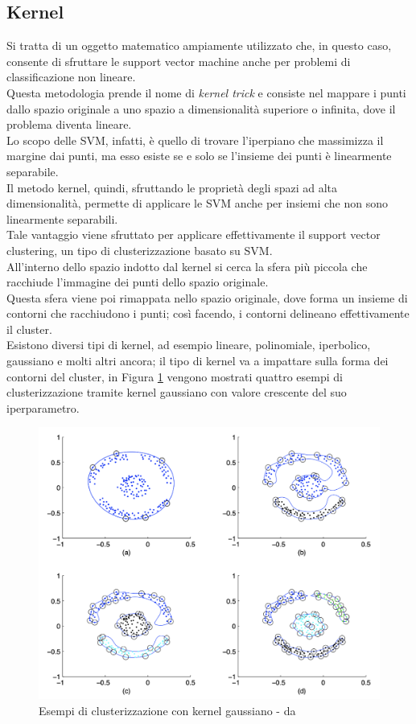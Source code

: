 \documentclass[12pt]{report}
\theoremstyle{definition}
\begin{document}
\subsection{Kernel} \label{kernel}
Si tratta di un oggetto matematico ampiamente utilizzato che, in questo caso, consente di sfruttare le support vector machine anche per problemi di classificazione non lineare.
\\
Questa metodologia prende il nome di \textit{kernel trick} e consiste nel mappare i punti dallo spazio originale a uno spazio a dimensionalità superiore o infinita, dove il problema diventa lineare.
\\
Lo scopo delle SVM, infatti, è quello di trovare l'iperpiano che massimizza il margine dai punti, ma esso esiste se e solo se l'insieme dei punti è linearmente separabile.
\\
Il metodo kernel, quindi, sfruttando le proprietà degli spazi ad alta dimensionalità, permette di applicare le SVM anche per insiemi che non sono linearmente separabili.
\\
Tale vantaggio viene sfruttato per applicare effettivamente il support vector clustering, un tipo di clusterizzazione basato su SVM.
\\
All'interno dello spazio indotto dal kernel si cerca la sfera più piccola che racchiude l'immagine dei punti dello spazio originale.
\\
Questa sfera viene poi rimappata nello spazio originale, dove forma un insieme di contorni che racchiudono i punti; così facendo, i contorni delineano effettivamente il cluster.
\\
Esistono diversi tipi di kernel, ad esempio lineare, polinomiale, iperbolico, gaussiano e molti altri ancora; il tipo di kernel va a impattare sulla forma dei contorni del cluster, in Figura \ref{gaussian} vengono mostrati quattro esempi di clusterizzazione tramite kernel gaussiano con valore crescente del suo iperparametro.
\\
\begin{figure}[!h]
    \centering
    \includegraphics[scale = 0.7]{images/gaussian_kernel.png}
    \caption{Esempi di clusterizzazione con kernel gaussiano - da \cite{23}}
    \label{gaussian}
\end{figure}
\end{document}
